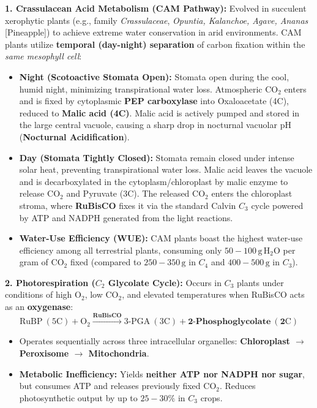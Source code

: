 \documentclass[10pt,twoside,openright]{book}
\begin{document}
\begin{conceptbox}
\textbf{1. Crassulacean Acid Metabolism (CAM Pathway):}
Evolved in succulent xerophytic plants (e.g., family \textit{Crassulaceae}, \textit{Opuntia, Kalanchoe, Agave, Ananas} [Pineapple]) to achieve extreme water conservation in arid environments. CAM plants utilize \textbf{temporal (day-night) separation} of carbon fixation within the \textit{same mesophyll cell}:
\begin{itemize}
  \item \textbf{Night (Scotoactive Stomata Open):} Stomata open during the cool, humid night, minimizing transpirational water loss. Atmospheric $\mathrm{CO}_2$ enters and is fixed by cytoplasmic \textbf{PEP carboxylase} into Oxaloacetate (4C), reduced to \textbf{Malic acid (4C)}. Malic acid is actively pumped and stored in the large central vacuole, causing a sharp drop in nocturnal vacuolar pH (\textbf{Nocturnal Acidification}).
  \item \textbf{Day (Stomata Tightly Closed):} Stomata remain closed under intense solar heat, preventing transpirational water loss. Malic acid leaves the vacuole and is decarboxylated in the cytoplasm/chloroplast by malic enzyme to release $\mathrm{CO}_2$ and Pyruvate (3C). The released $\mathrm{CO}_2$ enters the chloroplast stroma, where \textbf{RuBisCO} fixes it via the standard Calvin $C_3$ cycle powered by ATP and NADPH generated from the light reactions.
  \item \textbf{Water-Use Efficiency (WUE):} CAM plants boast the highest water-use efficiency among all terrestrial plants, consuming only $50-100\,\mathrm{g}\,\mathrm{H}_2\mathrm{O}$ per gram of $\mathrm{CO}_2$ fixed (compared to $250-350\,\mathrm{g}$ in $C_4$ and $400-500\,\mathrm{g}$ in $C_3$).
\end{itemize}

\textbf{2. Photorespiration ($C_2$ Glycolate Cycle):}
Occurs in $C_3$ plants under conditions of high $\mathrm{O}_2$, low $\mathrm{CO}_2$, and elevated temperatures when RuBisCO acts as an \textbf{oxygenase}:
\begin{equation}
  \mathrm{RuBP}\ (5\mathrm{C}) + \mathrm{O_2} \xrightarrow{\mathbf{RuBisCO}} \text{3-PGA}\ (3\mathrm{C}) + \mathbf{\text{2-Phosphoglycolate}\ (2\mathrm{C})}
\end{equation}
\begin{itemize}
  \item Operates sequentially across three intracellular organelles: \textbf{Chloroplast $\longrightarrow$ Peroxisome $\longrightarrow$ Mitochondria}.
  \item \textbf{Metabolic Inefficiency:} Yields \textbf{neither ATP nor NADPH nor sugar}, but consumes ATP and releases previously fixed $\mathrm{CO}_2$. Reduces photosynthetic output by up to $25-30\%$ in $C_3$ crops.
\end{itemize}
\end{conceptbox}
\end{document}
